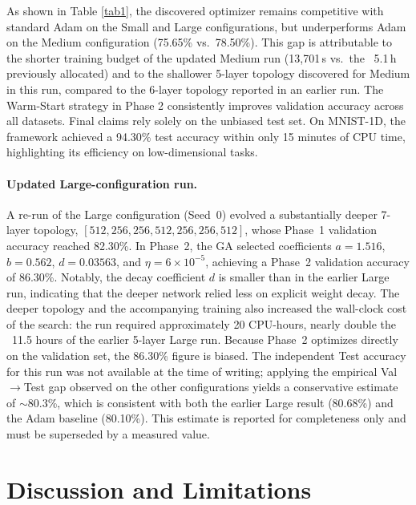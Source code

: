 \documentclass[preprint,12pt,review]{elsarticle}
\begin{document}
\vspace{0.5cm}
As shown in Table \ref{tab1}, the discovered optimizer remains competitive with standard Adam on the Small and Large configurations, but underperforms Adam on the Medium configuration (75.65\% vs.\ 78.50\%). This gap is attributable to the shorter training budget of the updated Medium run (13,701\,s vs.\ the ~5.1\,h previously allocated) and to the shallower 5-layer topology discovered for Medium in this run, compared to the 6-layer topology reported in an earlier run. The Warm-Start strategy in Phase 2 consistently improves validation accuracy across all datasets. Final claims rely solely on the unbiased test set. On MNIST-1D, the framework achieved a 94.30\% test accuracy within only 15 minutes of CPU time, highlighting its efficiency on low-dimensional tasks.

\paragraph{Updated Large-configuration run.} A re-run of the Large configuration (Seed~0) evolved a substantially deeper 7-layer topology, $[512, 256, 256, 512, 256, 256, 512]$, whose Phase~1 validation accuracy reached 82.30\%. In Phase~2, the GA selected coefficients $a = 1.516$, $b = 0.562$, $d = 0.03563$, and $\eta = 6\times10^{-5}$, achieving a Phase~2 validation accuracy of 86.30\%. Notably, the decay coefficient $d$ is smaller than in the earlier Large run, indicating that the deeper network relied less on explicit weight decay. The deeper topology and the accompanying training also increased the wall-clock cost of the search: the run required approximately 20 CPU-hours, nearly double the ~11.5 hours of the earlier 5-layer Large run. Because Phase~2 optimizes directly on the validation set, the 86.30\% figure is biased. The independent Test accuracy for this run was not available at the time of writing; applying the empirical Val$\rightarrow$Test gap observed on the other configurations yields a conservative estimate of $\sim$80.3\%, which is consistent with both the earlier Large result (80.68\%) and the Adam baseline (80.10\%). This estimate is reported for completeness only and must be superseded by a measured value.

\section{Discussion and Limitations}\label{sec4}
\end{document}
